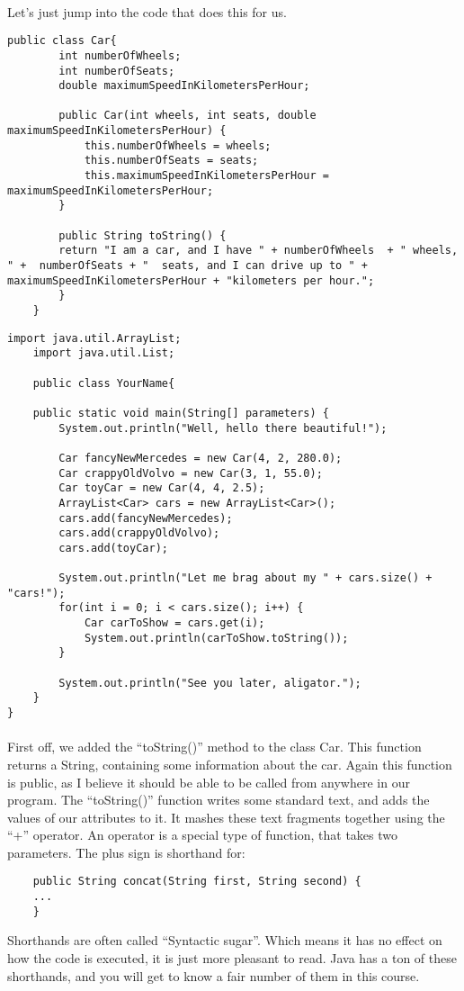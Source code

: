 \documentclass[11pt,fleqn]{book} %
\begin{document}
\paragraph{}Let's just jump into the code that does this for us.
\begin{lstlisting}[caption=Car.java]
	public class Car{
		int numberOfWheels;
		int numberOfSeats;
		double maximumSpeedInKilometersPerHour;
		
		public Car(int wheels, int seats, double maximumSpeedInKilometersPerHour) {
			this.numberOfWheels = wheels;
			this.numberOfSeats = seats;
			this.maximumSpeedInKilometersPerHour = maximumSpeedInKilometersPerHour;
		}
		
		public String toString() {
		return "I am a car, and I have " + numberOfWheels  + " wheels, " +  numberOfSeats + "  seats, and I can drive up to " + maximumSpeedInKilometersPerHour + "kilometers per hour.";
		}
	}
\end{lstlisting}

\begin{lstlisting}[caption=YourName.java]
	import java.util.ArrayList;
	import java.util.List;

	public class YourName{

	public static void main(String[] parameters) {
		System.out.println("Well, hello there beautiful!");
		
		Car fancyNewMercedes = new Car(4, 2, 280.0);
		Car crappyOldVolvo = new Car(3, 1, 55.0);
		Car toyCar = new Car(4, 4, 2.5);
		ArrayList<Car> cars = new ArrayList<Car>();
		cars.add(fancyNewMercedes);
		cars.add(crappyOldVolvo);
		cars.add(toyCar);
		
		System.out.println("Let me brag about my " + cars.size() + "cars!");
		for(int i = 0; i < cars.size(); i++) {
			Car carToShow = cars.get(i);
			System.out.println(carToShow.toString());
		}
		
		System.out.println("See you later, aligator.");
	}	
}
\end{lstlisting}

\paragraph{} First off, we added the ``toString()'' method to the class Car. This function returns a String, containing some information about the car. Again this function is public, as I believe it should be able to be called from anywhere in our program. The ``toString()'' function writes some standard text, and adds the values of our attributes to it. It mashes these text fragments together using the ``+'' operator. An operator is a special type of function, that takes two parameters. The plus sign is shorthand for:
\begin{lstlisting}
	public String concat(String first, String second) {
	...
	}
\end{lstlisting}
Shorthands are often called ``Syntactic sugar''. Which means it has no effect on how the code is executed, it is just more pleasant to read. Java has a ton of these shorthands, and you will get to know a fair number of them in this course.
\end{document}
